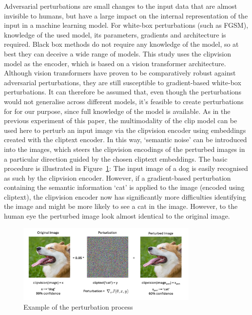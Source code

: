 Adversarial perturbations are small changes to the input data that are almost invisible to humans, but have a large impact on the internal representation of the input in a machine learning model. For white-box perturbations (such as FGSM\cite{goodfellowExplainingHarnessingAdversarial2014}), knowledge of the used model, its parameters, gradients and architecture is required. Black box methods do not require any knowledge of the model, so at best they can deceive a wide range of models\cite{papernotPracticalBlackBoxAttacks2017}. This study uses the clipvision model as the encoder, which is based on a vision transformer architecture\cite{dosovitskiyImageWorth16x162021}. Although vision transformers have proven to be comparatively robust against adversarial perturbations, they are still susceptible to gradient-based white-box perturbations\cite{naseerIntriguingPropertiesVision2021}. It can therefore be assumed that, even though the perturbations would not generalise across different models, it's feasible to create perturbations for for our purpose, since full knowledge of the model is available. As in the previous experiment of this paper, the multimodality of the clip model can be used here to perturb an input image via the clipvision encoder using embeddings created with the cliptext encoder. In this way, `semantic noise' can be introduced into the images, which steers the clipvision encodings of the perturbed images in a particular direction guided by the chosen cliptext embeddings. The basic procedure is illustrated in Figure~\ref{fig:perturbation_example}: The input image of a dog is easily recognised as such by the clipvision encoder. However, if a gradient-based perturbation containing the semantic information `cat' is applied to the image  (encoded using cliptext), the clipvision encoder now has significantly more difficulties identifying the image and might be more likely to see a cat in the image. However, to the human eye the perturbed image look almost identical to the original image.

\begin{figure}[ht]
    \centering
    \includegraphics[width=0.8\textwidth]{plots/peturbation_example.png}
    \caption{Example of the perturbation process}\label{fig:perturbation_example}
\end{figure}

